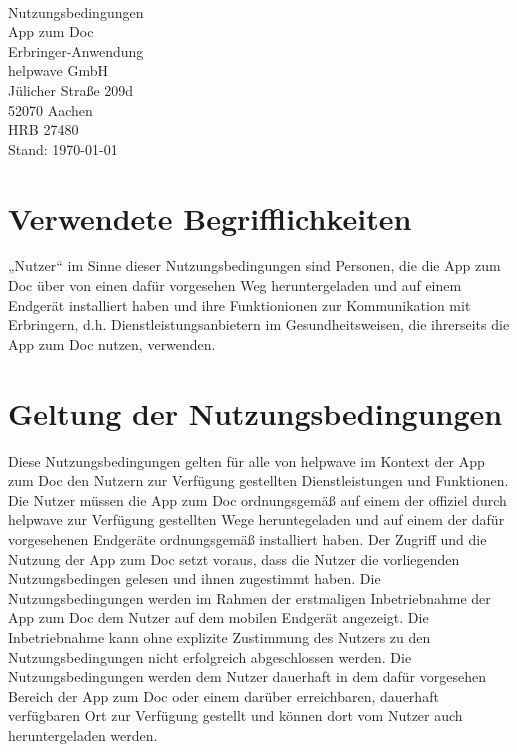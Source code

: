 \documentclass[10pt]{article}
\begin{document}
\begin{center}
	\\[4ex]
	{\Huge \sffamily
	Nutzungsbedingungen \\
	\huge App zum Doc \\[1ex] \Large Erbringer-Anwendung}\\[2ex]

	\vspace{1em}
	{\large
		helpwave GmbH \\
		Jülicher Straße 209d \\
		52070 Aachen \\
		HRB 27480}\\
	\vspace{1em}
	Stand: \today
\end{center}

\vspace{2ex}

\tableofcontents

\newpage

\section{Verwendete Begrifflichkeiten}
„Nutzer“ im Sinne dieser Nutzungsbedingungen sind Personen, die die App zum Doc über von einen dafür vorgesehen Weg heruntergeladen und auf einem Endgerät installiert haben und ihre Funktionionen zur Kommunikation mit Erbringern, d.h. Dienstleistungsanbietern im Gesundheitsweisen, die ihrerseits die App zum Doc nutzen, verwenden.

\section{Geltung der Nutzungsbedingungen}
Diese Nutzungsbedingungen gelten für alle von helpwave im Kontext der App zum Doc den Nutzern zur Verfügung gestellten Dienstleistungen und Funktionen. Die Nutzer müssen die App zum Doc ordnungsgemäß auf einem der offiziel durch helpwave zur Verfügung gestellten Wege heruntegeladen und auf einem der dafür vorgesehenen Endgeräte ordnungsgemäß installiert haben. Der Zugriff und die Nutzung der App zum Doc setzt voraus, dass die Nutzer die vorliegenden Nutzungsbedingen gelesen und ihnen zugestimmt haben. Die Nutzungsbedingungen werden im Rahmen der erstmaligen Inbetriebnahme der App zum Doc dem Nutzer auf dem mobilen Endgerät angezeigt. Die Inbetriebnahme kann ohne explizite Zustimmung des Nutzers zu den Nutzungsbedingungen nicht erfolgreich abgeschlossen werden. Die Nutzungsbedingungen werden dem Nutzer dauerhaft in dem dafür vorgesehen Bereich der App zum Doc oder einem darüber erreichbaren, dauerhaft verfügbaren Ort zur Verfügung gestellt und können dort vom Nutzer auch heruntergeladen werden.
\end{document}
